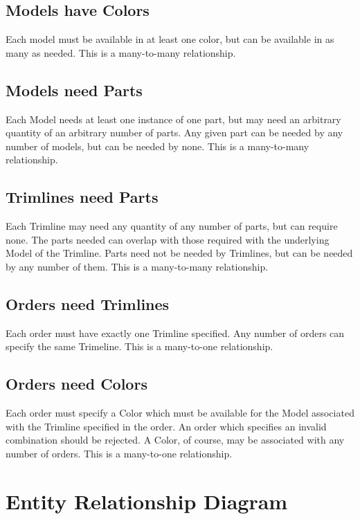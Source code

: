 \documentclass[11pt,letterpaper,oneside]{amsart}
\begin{document}
\subsection*{Models have Colors}

Each model must be available in at least one color, but can be available in as many as needed.  This is a many-to-many relationship.

\subsection*{Models need Parts}

Each Model needs at least one instance of one part, but may need an arbitrary quantity of an arbitrary number of parts.  Any given part can be needed by any number of models, but can be needed by none.  This is a many-to-many relationship.

\subsection*{Trimlines need Parts}

Each Trimline may need any quantity of any number of parts, but can require none.  The parts needed can overlap with those required with the underlying Model of the Trimline.  Parts need not be needed by Trimlines, but can be needed by any number of them.  This is a many-to-many relationship. 

\subsection*{Orders need Trimlines}

Each order must have exactly one Trimline specified.  Any number of orders can specify the same Trimeline.  This is a many-to-one relationship.

\subsection*{Orders need Colors}

Each order must specify a Color which must be available for the Model associated with the Trimline specified in the order.  An order which specifies an invalid combination should be rejected.  A Color, of course, may be associated with any number of orders.  This is a many-to-one relationship.

\section*{Entity Relationship Diagram}
\end{document}
